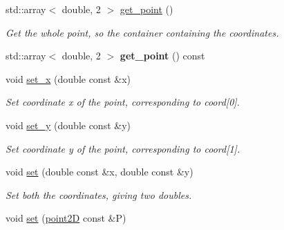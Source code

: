 \begin{DoxyCompactItemize}
\item 
\hypertarget{classpoint2D_a98ff7d3cbe3850d4c938a8ea7e62c17e}{
std::array$<$ double, 2 $>$ \hyperlink{classpoint2D_a98ff7d3cbe3850d4c938a8ea7e62c17e}{get\_\-point} ()}
\label{classpoint2D_a98ff7d3cbe3850d4c938a8ea7e62c17e}

\begin{DoxyCompactList}\small\item\em Get the whole point, so the container containing the coordinates. \item\end{DoxyCompactList}\item 
\hypertarget{classpoint2D_a8660b4a2429d2f44cf6c231c6dbe050f}{
std::array$<$ double, 2 $>$ {\bfseries get\_\-point} () const }
\label{classpoint2D_a8660b4a2429d2f44cf6c231c6dbe050f}

\item 
\hypertarget{classpoint2D_a9655d24de7b33c152d987dcae59d09bd}{
void \hyperlink{classpoint2D_a9655d24de7b33c152d987dcae59d09bd}{set\_\-x} (double const \&x)}
\label{classpoint2D_a9655d24de7b33c152d987dcae59d09bd}

\begin{DoxyCompactList}\small\item\em Set coordinate x of the point, corresponding to coord\mbox{[}0\mbox{]}. \item\end{DoxyCompactList}\item 
\hypertarget{classpoint2D_a6471a5d42da21992a28c7016fcdabf51}{
void \hyperlink{classpoint2D_a6471a5d42da21992a28c7016fcdabf51}{set\_\-y} (double const \&y)}
\label{classpoint2D_a6471a5d42da21992a28c7016fcdabf51}

\begin{DoxyCompactList}\small\item\em Set coordinate y of the point, corresponding to coord\mbox{[}1\mbox{]}. \item\end{DoxyCompactList}\item 
\hypertarget{classpoint2D_a36b0484942a7460785d2f608631d6b4b}{
void \hyperlink{classpoint2D_a36b0484942a7460785d2f608631d6b4b}{set} (double const \&x, double const \&y)}
\label{classpoint2D_a36b0484942a7460785d2f608631d6b4b}

\begin{DoxyCompactList}\small\item\em Set both the coordinates, giving two doubles. \item\end{DoxyCompactList}\item 
\hypertarget{classpoint2D_a460f43de148612f3b21ab24a06e706e5}{
void \hyperlink{classpoint2D_a460f43de148612f3b21ab24a06e706e5}{set} (\hyperlink{classpoint2D}{point2D} const \&P)}
\label{classpoint2D_a460f43de148612f3b21ab24a06e706e5}


\end{DoxyCompactItemize}
